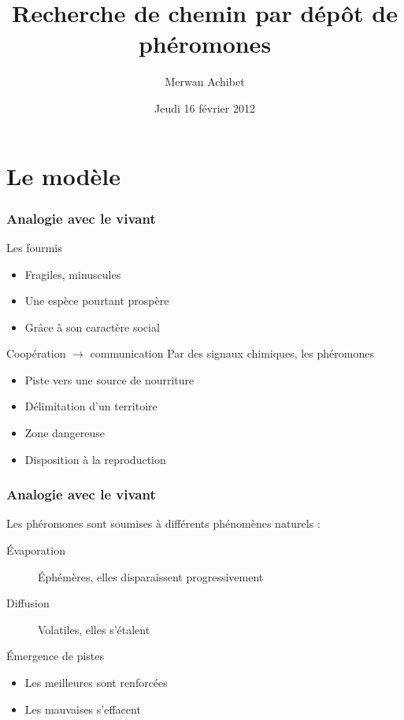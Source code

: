 \documentclass{beamer}
\title{Recherche de chemin par dépôt de phéromones}
\author{Merwan Achibet}
\institute{Université du Havre}
\date{Jeudi 16 février 2012}
\begin{document}
\maketitle

\section{Le modèle}

\begin{frame}

  \frametitle{Analogie avec le vivant}

  \begin{block}{Les fourmis}
    \begin{itemize}
    \item{Fragiles, minuscules}
    \item{Une espèce pourtant prospère}
    \item{Grâce à son caractère social}
    \end{itemize}
  \end{block}

  \vfill

  \begin{block}{Coopération $\rightarrow$ communication}
    Par des signaux chimiques, les phéromones
    \begin{itemize}
      \item{Piste vers une source de nourriture}
      \item{Délimitation d'un territoire}
      \item{Zone dangereuse}
      \item{Disposition à la reproduction}
    \end{itemize}
  \end{block}

\end{frame}

\begin{frame}

  \frametitle{Analogie avec le vivant}

  Les phéromones sont soumises à différents phénomènes naturels :
  \begin{description}
    \item[\'Evaporation]{\'Ephémères, elles disparaissent progressivement}
    \item[Diffusion]{Volatiles, elles s'étalent}
  \end{description}

  \vfill

  \begin{block}{\'Emergence de pistes}
    \begin{itemize}
    \item{Les meilleures sont renforcées}
    \item{Les mauvaises s'effacent}
    \end{itemize}
  \end{block}

\end{frame}
\end{document}
